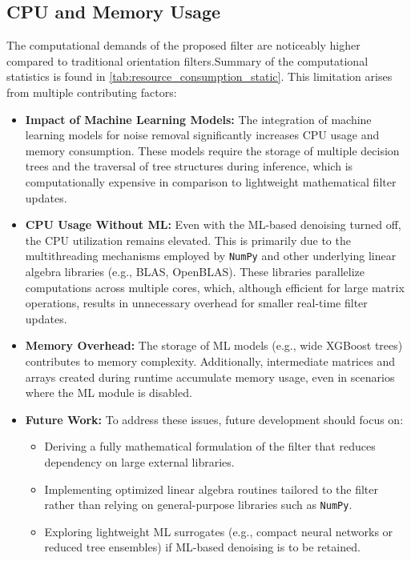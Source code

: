 \documentclass{iutbscthesis}
\begin{document}
\subsection{CPU and Memory Usage}

The computational demands of the proposed filter are noticeably higher compared to traditional orientation filters.Summary of the computational statistics is found in \autoref{tab:resource_consumption_static}. This limitation arises from multiple contributing factors:

\begin{itemize}
    \item \textbf{Impact of Machine Learning Models:}  
    The integration of machine learning models for noise removal significantly increases CPU usage and memory consumption. These models require the storage of multiple decision trees and the traversal of tree structures during inference, which is computationally expensive in comparison to lightweight mathematical filter updates.

    \item \textbf{CPU Usage Without ML:}  
    Even with the ML-based denoising turned off, the CPU utilization remains elevated. This is primarily due to the multithreading mechanisms employed by \texttt{NumPy} and other underlying linear algebra libraries (e.g., BLAS, OpenBLAS). These libraries parallelize computations across multiple cores, which, although efficient for large matrix operations, results in unnecessary overhead for smaller real-time filter updates.

    \item \textbf{Memory Overhead:}  
    The storage of ML models (e.g., wide XGBoost trees) contributes to memory complexity. Additionally, intermediate matrices and arrays created during runtime accumulate memory usage, even in scenarios where the ML module is disabled.

    \item \textbf{Future Work:}  
    To address these issues, future development should focus on:
    \begin{itemize}
        \item Deriving a fully mathematical formulation of the filter that reduces dependency on large external libraries.
        \item Implementing optimized linear algebra routines tailored to the filter rather than relying on general-purpose libraries such as \texttt{NumPy}.
        \item Exploring lightweight ML surrogates (e.g., compact neural networks or reduced tree ensembles) if ML-based denoising is to be retained.
    \end{itemize}
\end{itemize}
\end{document}
